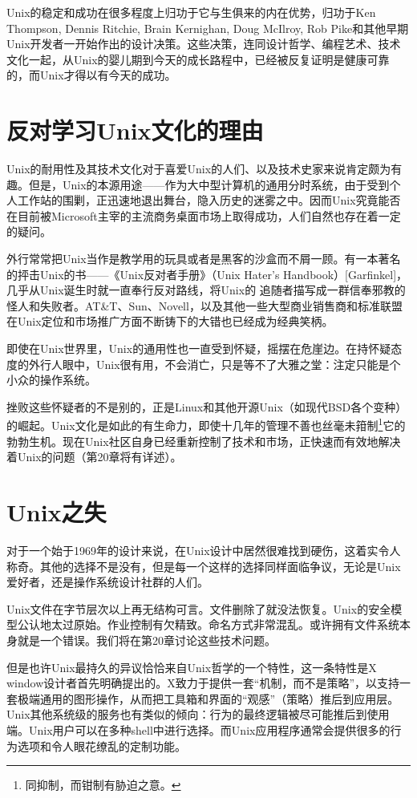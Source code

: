 \documentclass[12pt,oneside]{book}
\begin{document}
\begin{common-format}
Unix的稳定和成功在很多程度上归功于它与生俱来的内在优势，归功于Ken Thompson, Dennis Ritchie, Brain Kernighan, Doug McIlroy, Rob Pike和其他早期Unix开发者一开始作出的设计决策。这些决策，连同设计哲学、编程艺术、技术文化一起，从Unix的婴儿期到今天的成长路程中，已经被反复证明是健康可靠的，而Unix才得以有今天的成功。


\section{反对学习Unix文化的理由}
Unix的耐用性及其技术文化对于喜爱Unix的人们、以及技术史家来说肯定颇为有趣。但是，Unix的本源用途——作为大中型计算机的通用分时系统，由于受到个人工作站的围剿，正迅速地退出舞台，隐入历史的迷雾之中。因而Unix究竟能否在目前被Microsoft主宰的主流商务桌面市场上取得成功，人们自然也存在着一定的疑问。

外行常常把Unix当作是教学用的玩具或者是黑客的沙盒而不屑一顾。有一本著名的抨击Unix的书——《Unix反对者手册》（Unix Hater's Handbook）[Garfinkel]，几乎从Unix诞生时就一直奉行反对路线，将Unix的 追随者描写成一群信奉邪教的怪人和失败者。AT\&{}T、Sun、Novell，以及其他一些大型商业销售商和标准联盟在Unix定位和市场推广方面不断铸下的大错也已经成为经典笑柄。

即使在Unix世界里，Unix的通用性也一直受到怀疑，摇摆在危崖边。在持怀疑态度的外行人眼中，Unix很有用，不会消亡，只是等不了大雅之堂：注定只能是个小众的操作系统。

挫败这些怀疑者的不是别的，正是Linux和其他开源Unix（如现代BSD各个变种）的崛起。Unix文化是如此的有生命力，即使十几年的管理不善也丝毫未箝制\footnote{同抑制，而钳制有胁迫之意。}它的勃勃生机。现在Unix社区自身已经重新控制了技术和市场，正快速而有效地解决着Unix的问题（第20章将有详述）。


\section{Unix之失}
对于一个始于1969年的设计来说，在Unix设计中居然很难找到硬伤，这着实令人称奇。其他的选择不是没有，但是每一个这样的选择同样面临争议，无论是Unix爱好者，还是操作系统设计社群的人们。

Unix文件在字节层次以上再无结构可言。文件删除了就没法恢复。Unix的安全模型公认地太过原始。作业控制有欠精致。命名方式非常混乱。或许拥有文件系统本身就是一个错误。我们将在第20章讨论这些技术问题。

但是也许Unix最持久的异议恰恰来自Unix哲学的一个特性，这一条特性是X window设计者首先明确提出的。X致力于提供一套“机制，而不是策略”，以支持一套极端通用的图形操作，从而把工具箱和界面的“观感”（策略）推后到应用层。Unix其他系统级的服务也有类似的倾向：行为的最终逻辑被尽可能推后到使用端。Unix用户可以在多种shell中进行选择。而Unix应用程序通常会提供很多的行为选项和令人眼花缭乱的定制功能。


\end{common-format}
\end{document}
